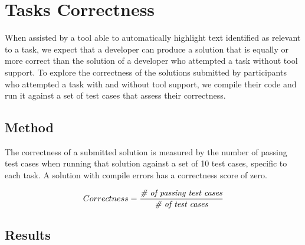 
\section{Tasks Correctness}
\label{cp6:correctness}



When assisted by a tool able to automatically highlight text identified as relevant to a task, we expect that a developer can produce a solution 
that is equally or more correct than the solution of a developer who attempted a task without tool support. 
To explore the correctness of the solutions submitted by participants who attempted a task 
with and without tool support, we compile their code and run it against a set of test cases 
that assess their correctness.


\subsection{Method}


The correctness of a submitted solution is measured by the number of passing test cases
when running that solution against a set of 10 test cases, specific to each task. 
A solution with compile errors has a correctness score of zero.


\smallskip
\begin{small}


\begin{equation}
    Correctness = \frac{ \text{\textit{\# of passing test cases}}}{\text{\textit{\#  of test cases}}}
\end{equation}
\end{small}

\subsection{Results}
 